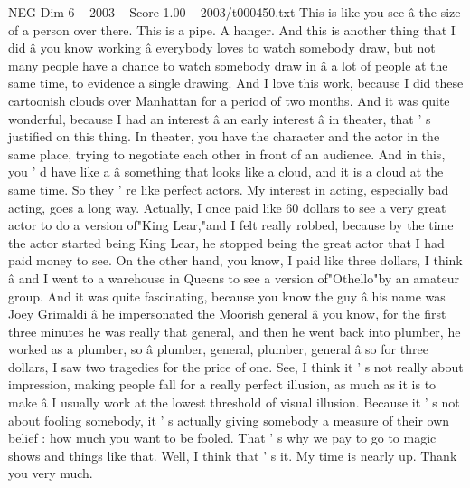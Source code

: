 \begin{textsample}{NEG Dim 6 – 2003 – Score 1.00 – 2003/t000450.txt}
This is like you see â the size of a person over there.
This is a pipe.
A hanger.
And this is another thing that I did â you know working â everybody loves to watch somebody draw, but not many people have a chance to watch somebody draw in â a lot of people at the same time, to evidence a single drawing.
And I love this work, because I did these cartoonish clouds over Manhattan for a period of two months.
And it was quite wonderful, because I had an interest â an early interest â in theater, that ' s justified on this thing.
In theater, you have the character and the actor in the same place, trying to negotiate each other in front of an audience.
And in this, you ' d have like a â something that looks like a cloud, and it is a cloud at the same time.
So they ' re like perfect actors.
My interest in acting, especially bad acting, goes a long way.
Actually, I once paid like 60 dollars to see a very great actor to do a version of"King Lear,"and I felt really robbed, because by the time the actor started being King Lear, he stopped being the great actor that I had paid money to see.
On the other hand, you know, I paid like three dollars, I think â and I went to a warehouse in Queens to see a version of"Othello"by an amateur group.
And it was quite fascinating, because you know the guy â his name was Joey Grimaldi â he impersonated the Moorish general â you know, for the first three minutes he was really that general, and then he went back into plumber, he worked as a plumber, so â plumber, general, plumber, general â so for three dollars, I saw two tragedies for the price of one.
See, I think it ' s not really about impression, making people fall for a really perfect illusion, as much as it is to make â I usually work at the lowest threshold of visual illusion.
Because it ' s not about fooling somebody, it ' s actually giving somebody a measure of their own belief : how much you want to be fooled.
That ' s why we pay to go to magic shows and things like that.
Well, I think that ' s it.
My time is nearly up.
Thank you very much.

\end{textsample}
